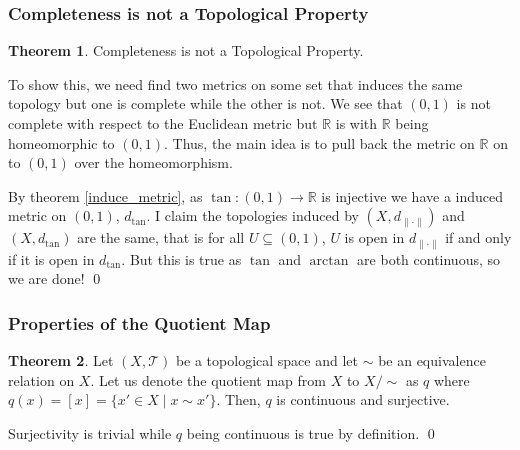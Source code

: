 \documentclass[
]{article}
\theoremstyle{definition}
\newtheorem{theorem}{Theorem}
\theoremstyle{definition}
\begin{document}
\hypertarget{completeness-is-not-a-topological-property}{%
\subsubsection{Completeness is not a Topological
Property}\label{completeness-is-not-a-topological-property}}

\begin{theorem}
  Completeness is not a Topological Property.
\end{theorem}
\proof

To show this, we need find two metrics on some set that induces the same
topology but one is complete while the other is not. We see that
\((0, 1)\) is not complete with respect to the Euclidean metric but
\(\mathbb{R}\) is with \(\mathbb{R}\) being homeomorphic to \((0, 1)\).
Thus, the main idea is to pull back the metric on \(\mathbb{R}\) on to
\((0, 1)\) over the homeomorphism.

By theorem \ref{induce_metric}, as \(\tan : (0, 1) \to \mathbb{R}\) is
injective we have a induced metric on \((0, 1)\), \(d_{\tan}\). I claim
the topologies induced by \((X, d_{\| \cdot \|})\) and \((X, d_{\tan})\)
are the same, that is for all \(U \subseteq (0, 1)\), \(U\) is open in
\(d_{\| \cdot \|}\) if and only if it is open in \(d_{\tan}\). But this
is true as \(\tan\) and \(\arctan\) are both continuous, so we are done!
\qed

\hypertarget{properties-of-the-quotient-map}{%
\subsubsection{Properties of the Quotient
Map}\label{properties-of-the-quotient-map}}

\begin{theorem}
  Let \((X, \mathcal{T})\) be a topological space and let \(\sim\) be an equivalence 
  relation on \(X\). Let us denote the quotient map from \(X\) to \(X / \sim\) as 
  \(q\) where \(q(x) = [x] = \{x' \in X \mid x \sim x'\}\). Then, \(q\) is continuous
  and surjective.
\end{theorem}
\proof

Surjectivity is trivial while \(q\) being continuous is true by
definition. \qed
\end{document}
